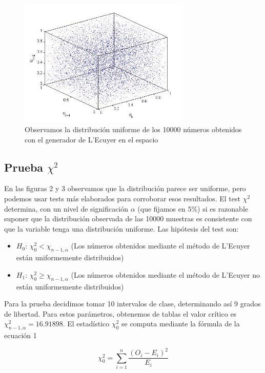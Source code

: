 \documentclass[10pt,journal,compsoc]{IEEEtran}
\begin{document}
\begin{figure}[t]
\label{fig:3d}
\begin{center}
\centering
\includegraphics[width=3.2in]{3d.jpg}
\caption{Observamos la distribuci\'on uniforme de los 10000 n\'umeros obtenidos con el generador de L'Ecuyer en el espacio}
\end{center}
\end{figure}

\subsection{Prueba $\chi^2$}
En las figuras 2 y 3 observamos que la distribuci\'on parece ser uniforme, pero podemos usar
tests m\'as elaborados para corroborar esos resultados. El test $\chi^2$ determina, con un nivel
de significaci\'on $\alpha$ (que fijamos en $5\%$) si es razonable suponer que la distribuci\'on 
observada de las 10000 muestras es consistente con que la variable tenga una distribuci\'on uniforme.
Las hip\'otesis del test son:
\begin{itemize}
 \item {$H_{0}$:} $\chi_{0}^2 < \chi_{n-1,\alpha}$ (Los n\'umeros obtenidos mediante el m\'etodo de L'Ecuyer est\'an uniformemente distribuidos)
 \item {$H_{1}$:} $\chi_{0}^2 \ge \chi_{n-1,\alpha}$ (Los n\'umeros obtenidos mediante el m\'etodo de L'Ecuyer no est\'an uniformemente distribuidos)
\end{itemize}
Para la prueba decidimos tomar 10 intervalos de clase, determinando as\'i 9 grados de libertad. Para estos
par\'ametros, obtenemos de tablas el valor cr\'itico es $\chi_{n-1,\alpha}^{2} = 16.91898$. El estad\'istico $\chi_{0}^{2}$ se computa
mediante la f\'ormula de la ecuaci\'on 1

\begin{equation}
 \chi_{0}^{2} = \sum_{i=1}^{n} \frac{(O_i - E_i)^2}{E_i}
\end{equation}
\end{document}
